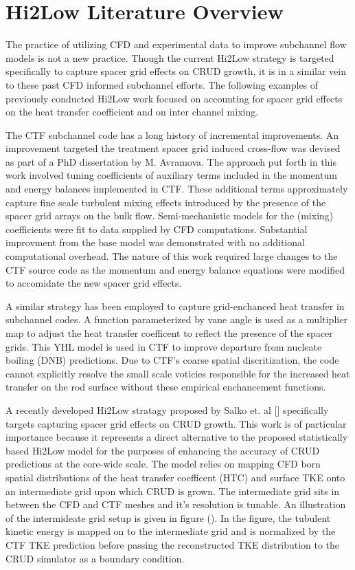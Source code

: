 \section{Hi2Low Literature Overview}

The practice of utilizing CFD and experimental data to improve subchannel flow models is not a new practice.  Though the current Hi2Low strategy is targeted specifically to capture spacer grid effects on CRUD growth, it is in a similar vein to these past CFD informed subchannel efforts.  The following examples of previously conducted Hi2Low work focused on accounting for spacer grid effects on the heat transfer coefficient and on inter channel mixing. 

The CTF subchannel code has a long history of incremental improvements.  An improvement targeted the treatment spacer grid induced cross-flow was devised as part of a PhD dissertation by M. Avramova.
The approach put forth in this work involved tuning coefficients of auxiliary terms included in the momentum and energy balances implemented in CTF.  These additional terms approximately capture fine scale turbulent mixing effects introduced by the presence of the spacer grid arrays on the bulk flow.  Semi-mechanistic models for the (mixing) coefficients were fit to data supplied by CFD computations.  Substantial improvment from the base model was demonstrated with no additional computational overhead.  The nature of this work required large changes to the CTF source code as the momentum and energy balance equations were modified to accomidate the new spacer grid effects.  

A similar strategy has been employed to capture grid-enchanced heat transfer in subchannel codes.   A function parameterized by vane angle is used as a multiplier map to adjust the heat transfer coefficent to reflect the presence of the spacer grids.  This YHL model is used in CTF to improve departure from nucleate boiling (DNB) predictions.  Due to CTF's coarse spatial discritization, the code cannot explicitly resolve the small scale voticies responsible for the increased heat transfer on the rod surface without these empirical enchancement functions.   

A recently developed Hi2Low stratagy proposed by Salko et. al [] specifically targets capturing spacer grid effects on CRUD growth.  This work is of particular importance because it represents a direct alternative to the proposed statistically based Hi2Low model for the purposes of enhancing the accuracy of CRUD predictions at the core-wide scale.  The model relies on mapping CFD born spatial distributions of the heat transfer coefficent (HTC) and surface TKE onto an intermediate grid upon which CRUD is grown.  The intermediate grid sits in between the CFD and CTF meshes and it's resolution is tunable.  An illustration of the intermideate grid setup is given in figure ().  In the figure, the tubulent kinetic energy is mapped on to the intermediate grid and is normalized by the CTF TKE prediction before passing the reconstructed TKE distribution to the CRUD simulator as a boundary condition. 

